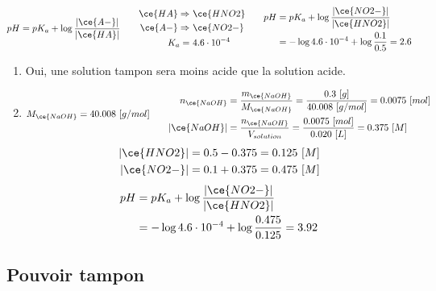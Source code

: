 \documentclass[
  11pt,
  a4paper,
  openany]{book}
\begin{document}
\begin{Answer}
\[
\begin{split}
  pH = pK_a + \log \frac{|\ce{A-}|}{|\ce{HA}|}
\end{split}
\qquad
\begin{split}
  \ce{HA} \Rightarrow &\ \ce{HNO2} \\
  \ce{A-} \Rightarrow &\ \ce{NO2-} \\
  K_a = &\ 4.6 \cdot 10^{-4}
\end{split}
\qquad
\begin{split}
  pH &= pK_a + \log \frac{|\ce{NO2-}|}{|\ce{HNO2}|} \\
  &= - \log 4.6 \cdot 10^{-4} + \log \frac{0.1}{0.5} = 2.6 \\
\end{split}
\]

\begin{enumerate}
\def\labelenumi{\alph{enumi}.}
\setcounter{enumi}{1}
\item
  Oui, une solution tampon sera moins acide que la solution acide.
\item
  \[
  \begin{split}
  M_{\ce{NaOH}} = 40.008\ [g/mol]
  \end{split}
  \qquad
  \begin{split}
  n_{\ce{NaOH}} &= \frac{m_{\ce{NaOH}}}{M_{\ce{NaOH}}} = \frac{0.3\ [g]}{40.008\ [g/mol]} = 0.0075\ [mol] \\
  |\ce{NaOH}| &= \frac{n_{\ce{NaOH}}}{V_{solution}} = \frac{0.0075\ [mol]}{0.020\ [L]} = 0.375\ [M]
  \end{split}
  \]
  \[
  \begin{split}
  |\ce{HNO2}| &= 0.5 - 0.375 = 0.125\ [M] \\
  |\ce{NO2-}| &= 0.1 + 0.375 = 0.475\ [M]
  \end{split}
  \]
  \[
  \begin{split}
    pH &= pK_a + \log \frac{|\ce{NO2-}|}{|\ce{HNO2}|} \\
    &= - \log 4.6 \cdot 10^{-4} + \log \frac{0.475}{0.125} = 3.92 \\
  \end{split}
  \]
\end{enumerate}

\end{Answer}

\subsection{Pouvoir tampon}\label{pouvoir-tampon}
\end{document}
